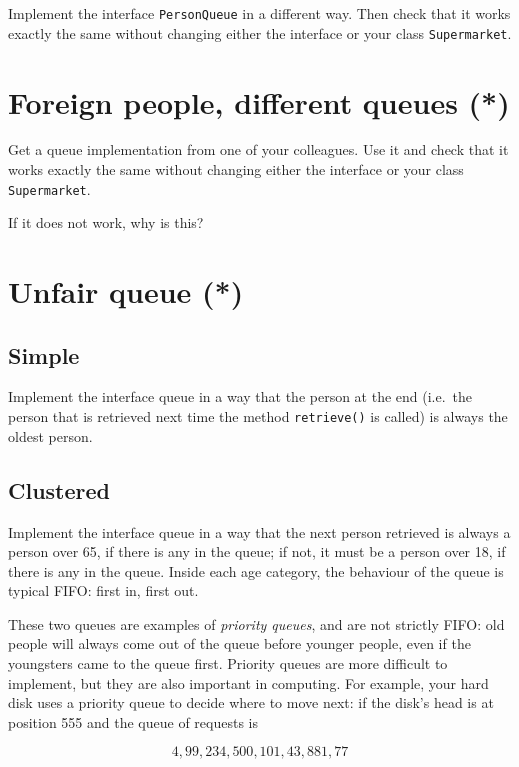 \documentclass{article}
\begin{document}
Implement the interface \verb+PersonQueue+ in a different way. Then check that it
works exactly the same without changing either the interface or your
class \verb+Supermarket+. 

\section{Foreign people, different queues (*)}
\label{sec:fore-people-diff}

Get a queue implementation from one of your colleagues. Use it and
check that it works exactly the same without changing either the
interface or your class \verb+Supermarket+. 

If it does not work, why is this?

\section{Unfair queue (*)}
\label{sec:unfair-queue-}

\subsection{Simple}
\label{sec:simple}

Implement the interface queue in a way that the person at the end
(i.e.~the person that is retrieved next time the method
\verb+retrieve()+ is called) is always the oldest person. 

\subsection{Clustered}
\label{sec:clustered}

Implement the interface queue in a way that the next person retrieved
is always a person over 65, if there is any in the queue; if not, it
must be a person over 18, if there is any in the queue. Inside each
age category, the behaviour of the queue is typical FIFO: first in,
first out. 

These two queues are examples of \emph{priority queues}, and are not
strictly FIFO: old people will always come out of the queue before
younger people, even if the youngsters came to the queue
first. Priority queues are more difficult to implement, but they are
also important in computing. For example, your hard disk uses a
priority queue to decide where to move next: if the disk's head is at
position 555 and the queue of requests is

$$4, 99, 234, 500, 101, 43, 881, 77$$
\end{document}
